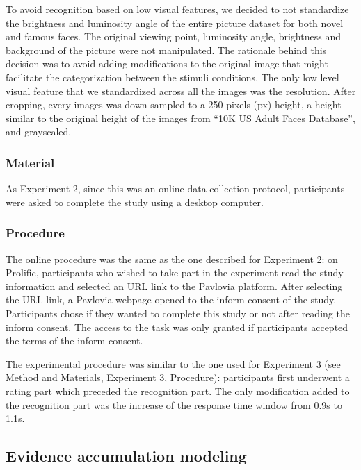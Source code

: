 \documentclass[
  letterpaper,
  DIV=11,
  numbers=noendperiod]{scrartcl}
\begin{document}
To avoid recognition based on low visual features, we decided to not
standardize the brightness and luminosity angle of the entire picture
dataset for both novel and famous faces. The original viewing point,
luminosity angle, brightness and background of the picture were not
manipulated. The rationale behind this decision was to avoid adding
modifications to the original image that might facilitate the
categorization between the stimuli conditions. The only low level visual
feature that we standardized across all the images was the resolution.
After cropping, every images was down sampled to a 250 pixels (px)
height, a height similar to the original height of the images from ``10K
US Adult Faces Database'', and grayscaled.

\subsubsection{Material}\label{material-3}

As Experiment 2, since this was an online data collection protocol,
participants were asked to complete the study using a desktop computer.

\subsubsection{Procedure}\label{procedure-3}

The online procedure was the same as the one described for Experiment 2:
on Prolific, participants who wished to take part in the experiment read
the study information and selected an URL link to the Pavlovia platform.
After selecting the URL link, a Pavlovia webpage opened to the inform
consent of the study. Participants chose if they wanted to complete this
study or not after reading the inform consent. The access to the task
was only granted if participants accepted the terms of the inform
consent.

The experimental procedure was similar to the one used for Experiment 3
(see Method and Materials, Experiment 3, Procedure): participants first
underwent a rating part which preceded the recognition part. The only
modification added to the recognition part was the increase of the
response time window from 0.9s to 1.1s.

\subsection{Evidence accumulation
modeling}\label{evidence-accumulation-modeling}
\end{document}
